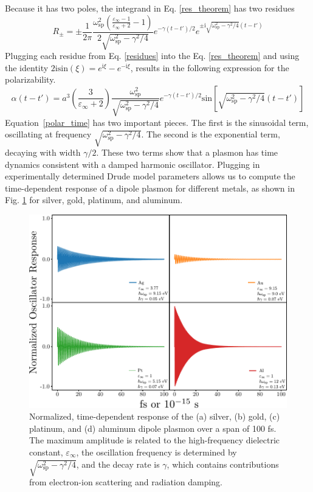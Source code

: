 \documentclass [11pt, proquest] {uwthesis}[2016/11/22]
\begin{document}
Because it has two poles, the integrand in Eq. \ref{res_theorem} has two residues
\begin{equation}
R_{\pm} = \pm\frac{1}{2\pi}\frac{\omega_{\textrm{sp}}^2\left(\frac{\varepsilon_{\infty}-1}{\varepsilon_{\infty}+2}-1\right)}{2\sqrt{\omega_\textrm{sp}^2-\gamma^2/4}}e^{-\gamma (t-t')/2}e^{\pm\textrm{i}\sqrt{\omega_\textrm{sp}^2-\gamma^2/4}(t-t')}
\label{residues}
\end{equation}
Plugging each residue from Eq. \ref{residues} into the Eq. \ref{res_theorem} and using the identity $2\textrm{i}\textrm{sin}(\xi) = e^{\textrm{i}\xi} - e^{-\textrm{i}\xi}$, results in the following expression for the polarizability.
\begin{equation}
\alpha(t-t') = a^3\left(\frac{3}{\varepsilon_{\infty}+2}\right)\frac{\omega_{\textrm{sp}}^2}{\sqrt{\omega_\textrm{sp}^2-\gamma^2/4}}e^{-\gamma (t-t')/2}\textrm{sin}\left[\sqrt{\omega_{\textrm{sp}}^2-\gamma^2/4}(t-t')\right]
\label{polar_time}
\end{equation}
Equation~\ref{polar_time} has two important pieces. The first is the sinusoidal term, oscillating at frequency $\sqrt{\omega_\textrm{sp}^2-\gamma^2/4}$. The second is the exponential term, decaying with width $\gamma/2$. These two terms show that a plasmon has time dynamics consistent with a damped harmonic oscillator. Plugging in experimentally determined Drude model parameters allows us to compute the time-dependent response of a dipole plasmon for different metals, as shown in Fig. \ref{alpha_metals} for silver, gold, platinum, and aluminum.

\begin{figure}
\begin{centering}
\includegraphics{all_alpha.pdf}
\caption{Normalized, time-dependent response of the (a) silver, (b) gold, (c) platinum, and (d) aluminum dipole plasmon over a span of 100 fs. The maximum amplitude is related to the high-frequency dielectric constant, $\varepsilon_{\infty}$, the oscillation frequency is determined by $\sqrt{\omega_{\textrm{sp}}^2 - \gamma^2/4}$, and the decay rate is $\gamma$, which contains contributions from electron-ion scattering and radiation damping.} 
\label{alpha_metals}
\end{centering}
\end{figure}
\end{document}
